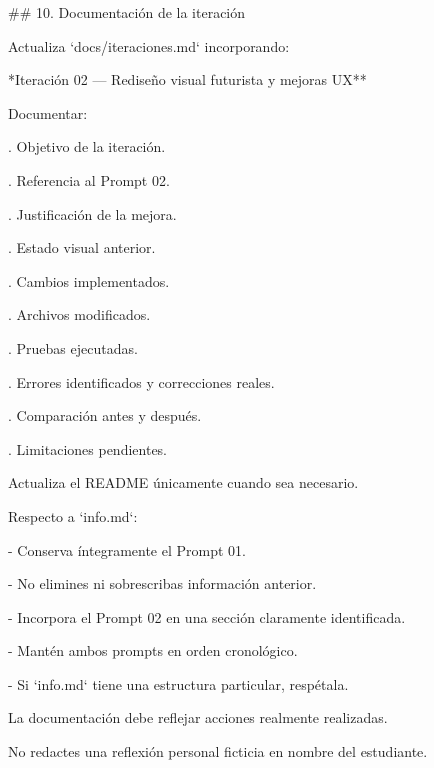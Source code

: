 \noindent \#\# 10. Documentación de la iteración\par
\par\smallskip
\noindent Actualiza `docs/iteraciones.md` incorporando:\par
\par\smallskip
\noindent **Iteración 02 — Rediseño visual futurista y mejoras UX**\par
\par\smallskip
\noindent Documentar:\par
\par\smallskip
{}. Objetivo de la iteración.\par
{}. Referencia al Prompt 02.\par
{}. Justificación de la mejora.\par
{}. Estado visual anterior.\par
{}. Cambios implementados.\par
{}. Archivos modificados.\par
{}. Pruebas ejecutadas.\par
{}. Errores identificados y correcciones reales.\par
{}. Comparación antes y después.\par
{}. Limitaciones pendientes.\par
\par\smallskip
\noindent Actualiza el README únicamente cuando sea necesario.\par
\par\smallskip
\noindent Respecto a `info.md`:\par
\par\smallskip
\noindent - Conserva íntegramente el Prompt 01.\par
\noindent - No elimines ni sobrescribas información anterior.\par
\noindent - Incorpora el Prompt 02 en una sección claramente identificada.\par
\noindent - Mantén ambos prompts en orden cronológico.\par
\noindent - Si `info.md` tiene una estructura particular, respétala.\par
\par\smallskip
\noindent La documentación debe reflejar acciones realmente realizadas.\par
\par\smallskip
\noindent No redactes una reflexión personal ficticia en nombre del estudiante.\par

